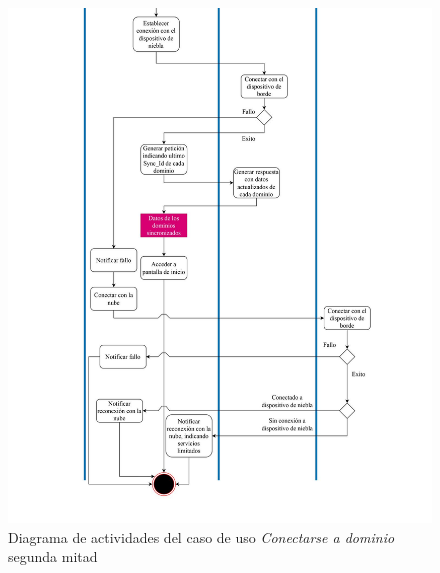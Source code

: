 \begin{figure}
    \centering
    \includegraphics[width=\textwidth, height=\textheight, keepaspectratio]{Imagenes/Implementacion/ConectarseDominioDA2.pdf}
    \caption{Diagrama de actividades del caso de uso \textit{Conectarse a dominio} segunda mitad}
    \label{fig:diagActConectDom2}
\end{figure}


